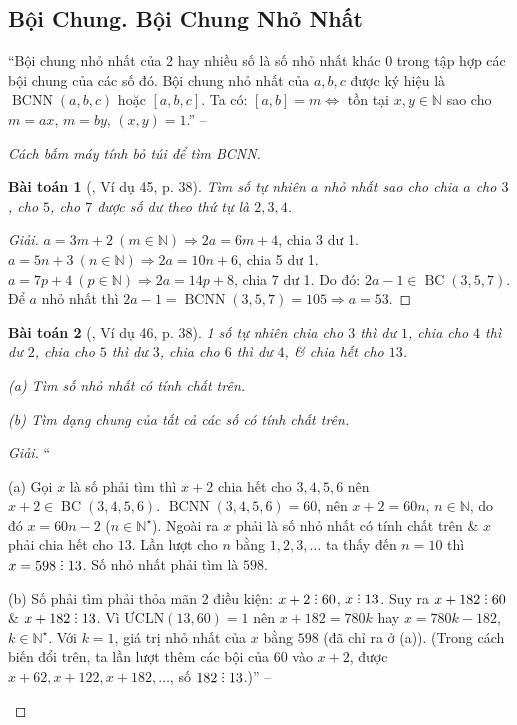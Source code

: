 \documentclass{article}
\numberwithin{equation}{section}
\newtheorem{baitoan}{Bài toán}[section]
\DeclareRobustCommand{\divby}{%
	\mathrel{\vbox{\baselineskip.65ex\lineskiplimit0pt\hbox{.}\hbox{.}\hbox{.}}}%
}
\begin{document}
\subsection{Bội Chung. Bội Chung Nhỏ Nhất}
``Bội chung nhỏ nhất của 2 hay nhiều số là số nhỏ nhất khác $0$ trong tập hợp các bội chung của các số đó. Bội chung nhỏ nhất của $a,b,c$ được ký hiệu là $\operatorname{BCNN}(a,b,c)$ hoặc $[a,b,c]$. Ta có: $[a,b] = m\Leftrightarrow$ tồn tại $x,y\in\mathbb{N}$ sao cho $m = ax$, $m = by$, $(x,y) = 1$.'' -- \cite[\S10, p. 38]{Binh_Toan_6_tap_1}

\textit{Cách bấm máy tính bỏ túi để tìm BCNN.}

\begin{baitoan}[\cite{Binh_Toan_6_tap_1}, Ví dụ 45, p. 38]
	Tìm số tự nhiên $a$ nhỏ nhất sao cho chia $a$ cho $3$, cho $5$, cho $7$ được số dư theo thứ tự là $2,3,4$.
\end{baitoan}

\begin{proof}[Giải]
	$a = 3m + 2\ (m\in\mathbb{N})\Rightarrow 2a = 6m + 4$, chia 3 dư 1. $a = 5n + 3\ (n\in\mathbb{N})\Rightarrow 2a = 10n + 6$, chia 5 dư 1. $a = 7p + 4\ (p\in\mathbb{N})\Rightarrow 2a = 14p + 8$, chia 7 dư 1. Do đó: $2a - 1\in\operatorname{BC}(3,5,7)$. Để $a$ nhỏ nhất thì $2a - 1 = \operatorname{BCNN}(3,5,7) = 105\Rightarrow a = 53$.
\end{proof}

\begin{baitoan}[\cite{Binh_Toan_6_tap_1}, Ví dụ 46, p. 38]
	1 số tự nhiên chia cho $3$ thì dư $1$, chia cho $4$ thì dư $2$, chia cho $5$ thì dư $3$, chia cho $6$ thì dư $4$, \& chia hết cho $13$.
	\begin{enumerate*}
		\item[(a)] Tìm số nhỏ nhất có tính chất trên.
		\item[(b)] Tìm dạng chung của tất cả các số có tính chất trên.
	\end{enumerate*}
\end{baitoan}

\begin{proof}[Giải]
	``\begin{enumerate*}
		\item[(a)] Gọi $x$ là số phải tìm thì $x + 2$ chia hết cho $3,4,5,6$ nên $x + 2\in\operatorname{BC}(3,4,5,6)$. $\operatorname{BCNN}(3,4,5,6) = 60$, nên $x + 2 = 60n$, $n\in\mathbb{N}$, do đó $x = 60n - 2$ ($n\in\mathbb{N}^\star$). Ngoài ra $x$ phải là số nhỏ nhất có tính chất trên \& $x$ phải chia hết cho $13$. Lần lượt cho $n$ bằng $1,2,3,\ldots$ ta thấy đến $n = 10$ thì $x = 598\divby 13$. Số nhỏ nhất phải tìm là $598$.
		\item[(b)] Số phải tìm phải thỏa mãn 2 điều kiện: $x + 2\divby 60$, $x\divby 13$. Suy ra $x + 182\divby 60$ \& $x + 182\divby 13$. Vì $\mbox{ƯCLN}(13,60) = 1$ nên $x + 182 = 780k$ hay $x = 780k - 182$, $k\in\mathbb{N}^\star$. Với $k = 1$, giá trị nhỏ nhất của $x$ bằng $598$ (đã chỉ ra ở (a)). (Trong cách biến đổi trên, ta lần lượt thêm các bội của $60$ vào $x + 2$, được $x + 62,x + 122,x + 182,\ldots$, số $182\divby 13$.)'' -- \cite[p. 38]{Binh_Toan_6_tap_1}
	\end{enumerate*}
\end{proof}
\end{document}
